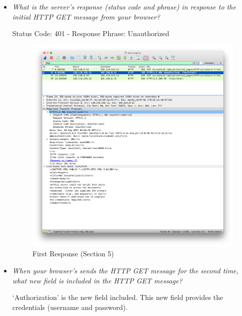 \documentclass[11pt]{article}
\begin{document}
\begin{itemize}
	\setlength\itemsep{1cm}

	\item
		\textit{What is the server’s response (status code and phrase) in response to the initial HTTP
GET message from your browser?}
	 \par Status Code: 401 - Response Phrase: Unauthorized
	 
	 	\begin{figure}[H]
		\centering
		\caption{First Response (Section 5)}
		\includegraphics[width=\textwidth]{05-response_1}
		\end{figure}
		
	\item
		\textit{When your browser’s sends the HTTP GET message for the second time, what new
field is included in the HTTP GET message?}
		\par `Authorization' is the new field included. This new field provides the credentials (username and password).


\end{itemize}
\end{document}
